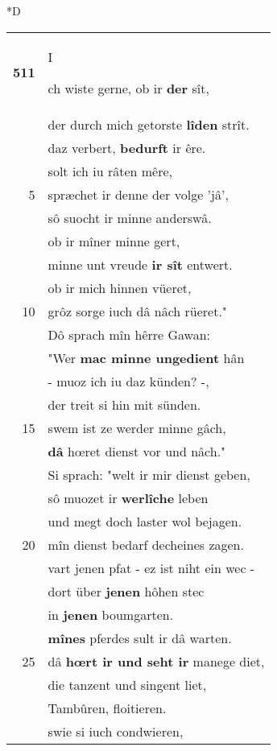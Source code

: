 \documentclass[8pt,a4paper,notitlepage]{article}
\begin{document}
\begin{table}[ht]
\begin{minipage}[t]{0.5\linewidth}
\small
\begin{center}*D
\end{center}
\begin{tabular}{rl}
\textbf{511} & \begin{large}I\end{large}ch wiste gerne, ob ir \textbf{der} sît,\\ 
 & der durch mich getorste \textbf{lîden} strît.\\ 
 & daz verbert, \textbf{bedurft} ir êre.\\ 
 & solt ich iu râten mêre,\\ 
5 & spræchet ir denne der volge 'jâ',\\ 
 & sô suocht ir minne anderswâ.\\ 
 & ob ir mîner minne gert,\\ 
 & minne unt vreude \textbf{ir sît} entwert.\\ 
 & ob ir mich hinnen vüeret,\\ 
10 & grôz sorge iuch dâ nâch rüeret."\\ 
 & Dô sprach mîn hêrre Gawan:\\ 
 & "Wer \textbf{mac minne ungedient} hân\\ 
 & - muoz ich iu daz künden? -,\\ 
 & der treit si hin mit sünden.\\ 
15 & swem ist ze werder minne gâch,\\ 
 & \textbf{dâ} hœret dienst vor und nâch."\\ 
 & Si sprach: "welt ir mir dienst geben,\\ 
 & sô muozet ir \textbf{werlîche} leben\\ 
 & und megt doch laster wol bejagen.\\ 
20 & mîn dienst bedarf decheines  zagen.\\ 
 & vart jenen pfat - ez ist niht ein wec -\\ 
 & dort über \textbf{jenen} hôhen stec\\ 
 & in \textbf{jenen} boumgarten.\\ 
 & \textbf{mînes} pferdes sult ir dâ warten.\\ 
25 & dâ \textbf{hœrt ir und seht ir} manege diet,\\ 
 & die tanzent und singent liet,\\ 
 & Tambûren, floitieren.\\ 
 & swie si iuch condwieren,\\ 

\end{tabular}
\end{minipage}
\end{table}
\end{document}
